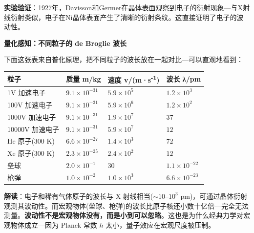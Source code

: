 \textbf{实验验证}：1927年，Davisson和Germer在晶体表面观察到电子的衍射现象---与X射线衍射类似，电子在Ni晶体表面产生了清晰的衍射条纹。这直接证明了电子的波动性。

\textbf{量化感知：不同粒子的 de Broglie 波长}

下面这张表来自普化原理，把不同粒子的波长放在一起对比---可以直观地看到：

{\def\LTcaptype{none} %
\begin{longtable}[]{@{}
  >{\raggedright\arraybackslash}p{}
  >{\raggedleft\arraybackslash}p{}
  >{\centering\arraybackslash}p{}
  >{\centering\arraybackslash}p{}@{}}
\toprule\noalign{}
\begin{minipage}[b]{\linewidth}\raggedright
粒子
\end{minipage} & \begin{minipage}[b]{\linewidth}\raggedleft
质量 m/kg
\end{minipage} & \begin{minipage}[b]{\linewidth}\centering
速度 v/(m·s\textsuperscript{-1})
\end{minipage} & \begin{minipage}[b]{\linewidth}\centering
波长 λ/pm
\end{minipage} \\
\midrule\noalign{}
\endhead
\bottomrule\noalign{}
\endlastfoot
1V 加速电子 & \(9.1\times 10^{-31}\) & \(5.9\times 10^5\) & \(1.2\times 10^{3}\) \\
100V 加速电子 & \(9.1\times 10^{-31}\) & \(5.9\times 10^6\) & \(1.2\times 10^{2}\) \\
1000V 加速电子 & \(9.1\times 10^{-31}\) & \(1.9\times 10^7\) & \(37\) \\
10000V 加速电子 & \(9.1\times 10^{-31}\) & \(5.9\times 10^7\) & \(12\) \\
He 原子(300 K) & \(6.6\times 10^{-27}\) & \(1.4\times 10^3\) & \(72\) \\
Xe 原子(300 K) & \(2.3\times 10^{-25}\) & \(2.4\times 10^2\) & \(12\) \\
垒球 & \(2.0\times 10^{-1}\) & \(30\) & \(1.1\times 10^{-22}\) \\
枪弹 & \(1.0\times 10^{-2}\) & \(1.0\times 10^3\) & \(6.6\times 10^{-23}\) \\
\end{longtable}
}

\textbf{解读}：电子和稀有气体原子的波长与 X 射线相当(\(\sim 10\text{–}10^3\) pm)，可通过晶体衍射观测其波动性。而宏观物体(垒球、枪弹)的波长比原子核还小数十亿倍---完全无法测量。\textbf{波动性不是宏观物体没有，而是小到可以忽略}。这也是为什么经典力学对宏观物体成立---因为 Planck 常数 \(h\) 太小，量子效应在宏观尺度被压制。

